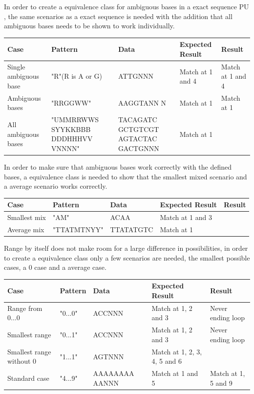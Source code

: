 \documentclass[12pt]{article}
\newcommand{\pu}{PU }
\begin{document}
In order to create a equivalence class for ambiguous bases in a exact sequence \pu, the same
scenarios as a exact sequence is needed with the addition that all ambiguous bases needs to be
shown to work individually. 
\begin{table}[H]
\begin{tabular}{p{4cm}|p{3.6cm}|p{2.5cm}|p{2.2cm}|p{2.2cm}}
Case 			& Pattern & Data & Expected Result & Result \\ \hline
Single ambiguous base & "R"(R is A or G) & ATTGNNN & Match at 1 and 4 & Match at 1 and 4 \\ \hline
Ambiguous bases	& "RRGGWW" & AAGGTANN N & Match at 1 & Match at 1 \\ \hline
All ambiguous bases & "UMMRRWWS SYYKKBBB DDDHHHVV VNNNN" & TACAGATC GCTGTCGT AGTACTAC GACTGNNN & Match at 1 & \\ \hline
\end{tabular}
\end{table}

In order to make sure that ambiguous bases work correctly with the defined bases, a equivalence class is needed
to show that the smallest mixed scenario and a average scenario works correctly.
\begin{table}[H]
\begin{tabular}{p{4cm}|p{3.6cm}|p{2.5cm}|p{2.2cm}|p{2.2cm}}
Case 			& Pattern & Data & Expected Result & Result \\ \hline
Smallest mix		& "AM" & ACAA & Match at 1 and 3 & \\ \hline
Average mix		& "TTATMTNYY" & TTATATGTC & Match at 1 & 
\end{tabular}
\end{table}


Range by itself does not make room for a large difference in possibilities, in order to create a 
equivalence class only a few scenarios are needed, the smallest possible cases, a 0 case and a average case.
\begin{table}[H]
\begin{tabular}{p{4cm}|p{3cm}|p{2.5cm}|p{2.5cm}|p{2.5cm}}
Case 			& Pattern & Data & Expected Result & Result \\ \hline
Range from 0...0	& "0...0" & ACCNNN & Match at 1, 2 and 3 & Never ending loop \\ \hline
Smallest range 	& "0...1" & ACCNNN & Match at 1, 2 and 3 & Never ending loop \\ \hline
Smallest range without 0 & "1...1" & AGTNNN & Match at 1, 2, 3, 4, 5 and 6 & \\ \hline
Standard case	& "4...9" & AAAAAAAA AANNN & Match at 1 and 5 & Match at 1, 5 and 9
\end{tabular}
\end{table} 
\end{document}
